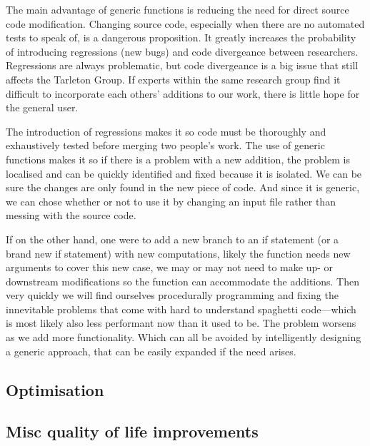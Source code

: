 The main advantage of generic functions is reducing the need for direct source code modification. Changing source code, especially when there are no automated tests to speak of, is a dangerous proposition. It greatly increases the probability of introducing regressions (new bugs) and code divergeance between researchers. Regressions are always problematic, but code divergeance is a big issue that still affects the Tarleton Group. If experts within the same research group find it difficult to incorporate each others' additions to our work, there is little hope for the general user.

The introduction of regressions makes it so code must be thoroughly and exhaustively tested before merging two people's work. The use of generic functions makes it so if there is a problem with a new addition, the problem is localised and can be quickly identified and fixed because it is isolated. We can be sure the changes are only found in the new piece of code. And since it is generic, we can chose whether or not to use it by changing an input file rather than messing with the source code.

If on the other hand, one were to add a new branch to an if statement (or a brand new if statement) with new computations, likely the function needs new arguments to cover this new case, we may or may not need to make up- or downstream modifications so the function can accommodate the additions. Then very quickly we will find ourselves procedurally programming and fixing the innevitable problems that come with hard to understand spaghetti code---which is most likely also less performant now than it used to be. The problem worsens as we add more functionality. Which can all be avoided by intelligently designing a generic approach, that can be easily expanded if the need arises.

\subsection{Optimisation}

\subsection{Misc quality of life improvements}

